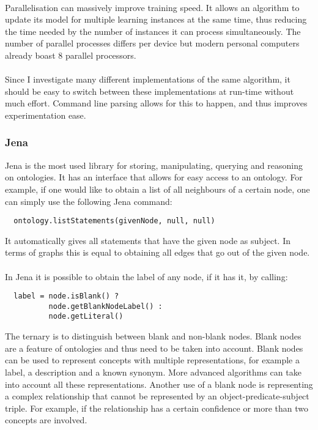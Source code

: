 \documentclass{article}
\begin{document}
 \paragraph{}
 Parallelisation can massively improve training speed. It allows an algorithm to update its model for multiple learning instances at the same time, thus reducing the time needed by the number of instances it can process simultaneously. The number of parallel processes differs per device but modern personal computers already boast 8 parallel processors.
 \paragraph{}
 Since I investigate many different implementations of the same algorithm, it should be easy to switch between these implementations at run-time without much effort. Command line parsing allows for this to happen, and thus improves experimentation ease.
 
 \subsubsection{Jena}
 Jena is the most used library for storing, manipulating, querying and reasoning on ontologies\cite{jena}. It has an interface that allows for easy access to an ontology. For example, if one would like to obtain a list of all neighbours of a certain node, one can simply use the following Jena command:
 
 \lstset{language=Java}
 \begin{lstlisting}
  ontology.listStatements(givenNode, null, null)
 \end{lstlisting}
 
 It automatically gives all statements that have the given node as subject. In terms of graphs this is equal to obtaining all edges that go out of the given node.
 \paragraph{}
 In Jena it is possible to obtain the label of any node, if it has it, by calling:
 
 \lstset{language=Java}
 \begin{lstlisting}
  label = node.isBlank() ? 
  		  node.getBlankNodeLabel() : 
  		  node.getLiteral()
 \end{lstlisting}
 
 The ternary is to distinguish between blank and non-blank nodes. Blank nodes are a feature of ontologies and thus need to be taken into account. Blank nodes can be used to represent concepts with multiple representations, for example a label, a description and a known synonym. More advanced algorithms can take into account all these representations. Another use of a blank node is representing a complex relationship that cannot be represented by an object-predicate-subject triple. For example, if the relationship has a certain confidence or more than two concepts are involved.
 
\end{document}
